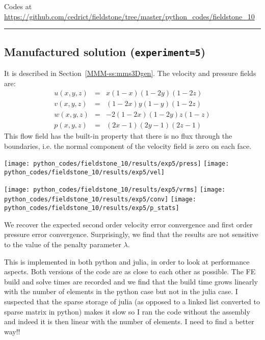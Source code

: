 

\begin{center}
Codes at \url{https://github.com/cedrict/fieldstone/tree/master/python_codes/fieldstone_10}
\end{center}

\par\noindent\rule{\textwidth}{0.4pt}


\subsection*{Manufactured solution ({\tt experiment=5})}

It is described in Section~\ref{MMM-ss:mms3Dgen}.
The velocity and pressure fields are:
\begin{eqnarray}
u(x,y,z) &=& x(1-x)(1-2y)(1-2z)\\
v(x,y,z) &=& (1-2x) y(1-y) (1-2z) \\
w(x,y,z) &=& -2(1-2x)(1-2y)z(1-z) \\
p(x,y,z) &=& (2x-1)(2y-1)(2z-1)
\end{eqnarray}
This flow field has the built-in property that there is no flux through the 
boundaries, i.e. the normal component of the velocity field is zero on each face. 

\begin{center}
\texttt{[image: python\_codes/fieldstone\_10/results/exp5/press]}
\texttt{[image: python\_codes/fieldstone\_10/results/exp5/vel]}
\end{center}

\begin{center}
\texttt{[image: python\_codes/fieldstone\_10/results/exp5/vrms]}
\texttt{[image: python\_codes/fieldstone\_10/results/exp5/conv]}
\texttt{[image: python\_codes/fieldstone\_10/results/exp5/p\_stats]}
\end{center}
We recover the expected second order velocity error convergence 
and first order pressure error convergence. 
Surprisingly, we find that the results are not sensitive to the value of the penalty parameter $\lambda$.

This \stone is implemented in both python and julia, in order to look at
performance aspects. Both versions of the code are as close to each other 
as possible. The FE build and solve times are recorded and we find
that the build time grows linearly with the number of elements in the python 
case but not in the julia case. I suspected that the sparse storage of julia
(as opposed to a linked list converted to sparse matrix in python) makes it slow
so I ran the code without the assembly and indeed it is then linear with the 
number of elements.
I need to find a better way!!

